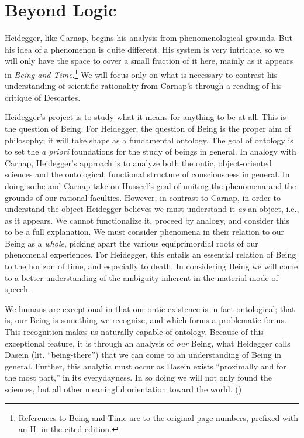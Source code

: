 \documentclass[leqno, 12pt]{turabian-researchpaper}
\begin{document}
	\section{Beyond Logic}

	Heidegger, like Carnap, begins his analysis from phenomenological grounds. But
	his idea of a phenomenon is quite different. His system is very intricate, so
	we will only have the space to cover a small fraction of it here, mainly as it
	appears in \textit{Being and Time}.\footnote{References to Being and Time are
	to the original page numbers, prefixed with an H. in the cited edition.} We
	will focus only on what is necessary to contrast his understanding of
	scientific rationality from Carnap's through a reading of his critique of
	Descartes.

	Heidegger's project is to study what it means for anything to be at all. This is
	the question of Being. For Heidegger, the question of Being is the proper aim of
	philosophy; it will take shape as a fundamental ontology. The goal of ontology
	is to set the \textit{a priori} foundations for the study of beings in general.
	In analogy with Carnap, Heidegger's approach is to analyze both the ontic, object-oriented
	sciences and the ontological, functional structure of consciousness in general.
	In doing so he and Carnap take on Husserl's goal of uniting the phenomena and the
	grounds of our rational faculties. However, in contrast to Carnap, in order to
	understand the object Heidegger believes we must understand it \emph{as} an object,
	i.e., as it appears. We cannot functionalize it, proceed by analogy, and consider
	this to be a full explanation. We must consider phenomena in their relation to
	our Being as a \emph{whole}, picking apart the various equiprimordial roots of
	our phenomenal experiences. For Heidegger, this entails an essential relation
	of Being to the horizon of time, and especially to death. In considering Being
	we will come to a better understanding of the ambiguity inherent in the
	material mode of speech.

	We humans are exceptional in that our ontic existence is in fact ontological; that
	is, our Being is something we recognize, and which forms a problematic for us.
	This recognition makes us naturally capable of ontology. Because of this exceptional
	feature, it is through an analysis of \emph{our} Being, what Heidegger calls
	Dasein (lit. \enquote{being-there}) that we can come to an understanding of
	Being in general. Further, this analytic must occur as Dasein exists \enquote{proximally and for the most part,}
	in its everydayness. In so doing we will not only found the sciences, but all other
	meaningful orientation toward the world. ()
\end{document}
